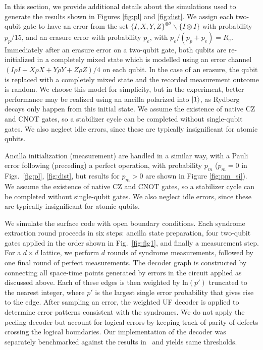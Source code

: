 \documentclass[%
reprint,
superscriptaddress,
 amsmath,amssymb,
 aps,
 prx,
floatfix,
]{revtex4-1}
\begin{document}
In this section, we provide additional details about the simulations used to generate the results shown in Figures \ref{fig:pl} and \ref{fig:dist}. We assign each two-qubit gate to have an error from the set $\{I,X,Y,Z\}^{\otimes 2}\backslash \{I\otimes I\}$ with probability $p_p/15$, and an erasure error with probability $p_e$, with $p_e/(p_p+p_e) = R_e$. Immediately after an erasure error on a two-qubit gate, both qubits are re-initialized in a completely mixed state which is modelled using an error channel $(I\rho I+X\rho X+Y\rho Y+Z\rho Z)/4$ on each qubit. In the case of an erasure, the qubit is replaced with a completely mixed state and the recorded measurement outcome is random. We choose this model for simplicity, but in the experiment, better performance may be realized using an ancilla polarized into $\ket{1}$, as Rydberg decays only happen from this initial state. We assume the existence of native CZ and CNOT gates, so a stabilizer cycle can be completed without single-qubit gates. We also neglect idle errors, since these are typically insignificant for atomic qubits.

Ancilla initialization (measurement) are handled in a similar way, with a Pauli error following (preceding) a perfect operation, with probability $p_m$ ($p_m=0$ in Figs.~\ref{fig:pl}, \ref{fig:dist}, but results for $p_m>0$ are shown in Figure \ref{fig:pm_si}). We assume the existence of native CZ and CNOT gates, so a stabilizer cycle can be completed without single-qubit gates. We also neglect idle errors, since these are typically insignificant for atomic qubits.

We simulate the surface code with open boundary conditions. Each syndrome extraction round proceeds in six
steps: ancilla state preparation, four two-qubit gates applied in the order shown in Fig.~\ref{fig:fig1}, and finally a
measurement step. For a $d\times d$ lattice, we perform $d$ rounds of syndrome measurements, followed by one final round of perfect measurements. The decoder
graph is constructed by connecting all space-time points generated by errors in the circuit applied as discussed above. Each
of these edges is then weighted by $\mathrm{ln}(p')$ truncated to the nearest integer, where $p'$ is the largest single error probability that gives rise to the edge. After sampling an error, the weighted UF decoder is applied
to determine error patterns consistent with the syndromes. We do not apply the peeling decoder but account for logical errors by keeping track of parity of defects crossing the logical boundaries. Our implementation of the decoder was separately benchmarked against the results in~\cite{huang2020a} and yields same thresholds.
\end{document}
